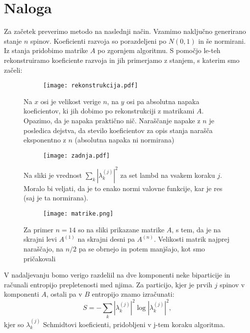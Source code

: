 \documentclass{article}
\begin{document}
\section*{Naloga}

Za začetek preverimo metodo na naslednji način. Vzamimo naključno generirano stanje $n$ spinov. Koeficienti razvoja so porazdeljeni po $N(0,1)$ in še normirani.
Iz stanja pridobimo matrike $A$ po zgornjem algoritmu. S pomočjo le-teh rekonstruiramo koeficiente razvoja in jih primerjamo z stanjem, s katerim smo začeli:
\begin{figure}[H]
\centering
\begin{subfigure}{.7\textwidth}
\texttt{[image: rekonstrukcija.pdf]}
\end{subfigure}
\caption*{Na $x$ osi je velikost verige $n$, na $y$ osi pa absolutna napaka koeficientov, ki jih dobimo po rekonstrukciji z matrikami $A$. Opazimo, da je napaka praktično nič. Naraščanje napake z $n$ je posledica dejstva, da stevilo koeficientov za opis stanja narašča eksponentno z $n$ (absolutna napaka ni normirana)}
\end{figure}

\begin{figure}[H]
\centering
\begin{subfigure}{.7\textwidth}
\texttt{[image: zadnja.pdf]}
\end{subfigure}
\caption*{Na sliki je vrednost $\sum_k |\lambda_k^{(j)}|^2$ za set lambd na vsakem koraku $j$. Moralo bi veljati, da je to enako normi valovne funkcije, kar je res (saj je ta normirana).}
\end{figure}


\begin{figure}[H]
\centering
\begin{subfigure}{.7\textwidth}
\texttt{[image: matrike.png]}
\end{subfigure}
\caption*{Za primer $n=14$ so na sliki prikazane matrike $A$, s tem, da je na skrajni levi $A^{(1)}$ na skrajni desni pa $A^{(n)}$. Velikosti matrik najprej naraščajo, na $n/2$ pa se obrnejo in potem manjšajo, kot smo pričakovali}
\end{figure}


V nadaljevanju bomo verigo razdeliil na dve komponenti neke biparticije in računali entropijo prepletenosti med njima.
Za particijo, kjer je prvih $j$ spinov v komponenti $A$, ostali pa v $B$ entropijo znamo izračunati:
\begin{equation*}
S=- \sum_k |\lambda_k^{(j)}|^2 \log |\lambda_k^{(j)}|^2,
\end{equation*}
kjer so $\lambda_k^{(j)}$ Schmidtovi koeficienti, pridobljeni v j-tem koraku algoritma.
\end{document}
